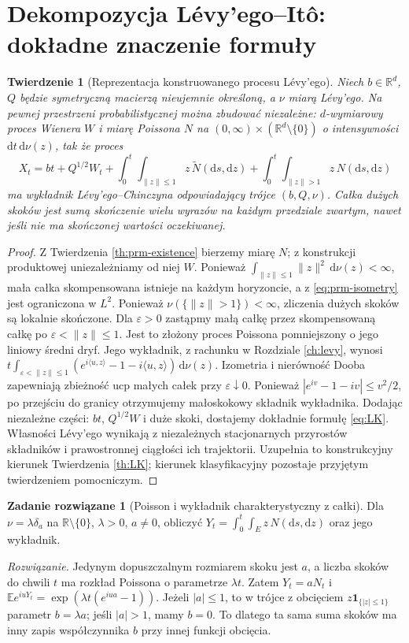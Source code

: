 \documentclass[11pt,a4paper,oneside]{report}
\numberwithin{equation}{chapter}
\theoremstyle{plain}
\newtheorem{twierdzenie}{Twierdzenie}[chapter]
\theoremstyle{definition}
\newtheorem{zadanie}{Zadanie rozwiązane}[chapter]
\theoremstyle{remark}
\newcommand{\R}{\mathbb{R}}
\newcommand{\E}{\mathbb{E}}
\newcommand{\ind}[1]{\mathbf{1}_{#1}}
\newcommand{\dd}{\mathrm{d}}
\begin{document}
\section{Dekompozycja Lévy'ego--Itô: dokładne znaczenie formuły}\label{sec:volIII:11:06}

\begin{twierdzenie}[Reprezentacja konstruowanego procesu Lévy'ego]\label{thm:volIII:11:07}
\label{th:levy-ito-made}
Niech $b\in\R^d$, $Q$ będzie symetryczną macierzą
nieujemnie określoną, a $\nu$ miarą Lévy'ego.
Na pewnej przestrzeni probabilistycznej można zbudować
niezależne: $d$-wymiarowy proces Wienera $W$ i miarę
Poissona $N$ na $(0,\infty)\times(\R^d\setminus\{0\})$
o intensywności $\dd t\,\dd\nu(z)$, tak że proces
\[
X_t=bt+Q^{1/2}W_t
+\int_0^t\int_{\|z\|\le1}z\,\widetilde N(\dd s,\dd z)
+\int_0^t\int_{\|z\|>1}z\,N(\dd s,\dd z)
\tag{11.4}\label{eq:levy-ito-made}
\]
ma wykładnik Lévy'ego--Chinczyna odpowiadający trójce
$(b,Q,\nu)$. Całka dużych skoków jest sumą skończenie
wielu wyrazów na każdym przedziale zwartym, nawet jeśli
nie ma skończonej wartości oczekiwanej.
\end{twierdzenie}
\begin{proof}
Z Twierdzenia \ref{th:prm-existence} bierzemy miarę $N$;
z konstrukcji produktowej uniezależniamy od niej $W$.
Ponieważ $\int_{\|z\|\le1}\|z\|^2\,\dd\nu(z)<\infty$,
mała całka skompensowana istnieje na każdym horyzoncie,
a z \eqref{eq:prm-isometry} jest ograniczona w $L^2$.
Ponieważ $\nu(\{\|z\|>1\})<\infty$, zliczenia dużych
skoków są lokalnie skończone. Dla $\varepsilon>0$
zastąpmy małą całkę przez skompensowaną całkę po
$\varepsilon<\|z\|\le1$. Jest to złożony proces
Poissona pomniejszony o jego liniowy średni dryf.
Jego wykładnik, z rachunku w Rozdziale \ref{ch:levy},
wynosi $t\int_{\varepsilon<\|z\|\le1}
(e^{i\langle u,z\rangle}-1-i\langle u,z\rangle)\,\dd\nu(z)$.
Izometria i nierówność Dooba zapewniają zbieżność ucp
małych całek przy $\varepsilon\downarrow0$.
Ponieważ $|e^{iv}-1-iv|\le v^2/2$, po przejściu
do granicy otrzymujemy małoskokowy składnik wykładnika.
Dodając niezależne części: $bt$, $Q^{1/2}W$ i duże skoki,
dostajemy dokładnie formułę \eqref{eq:LK}.
Własności Lévy'ego wynikają z niezależnych stacjonarnych
przyrostów składników i prawostronnej ciągłości ich
trajektorii. Uzupełnia to konstrukcyjny kierunek
Twierdzenia \ref{th:LK}; kierunek klasyfikacyjny pozostaje
przyjętym twierdzeniem pomocniczym.
\end{proof}

\begin{zadanie}[Poisson i wykładnik charakterystyczny z całki]
Dla $\nu=\lambda\delta_a$ na $\R\setminus\{0\}$,
$\lambda>0$, $a\ne0$, obliczyć
$Y_t=\int_0^t\int_E z\,N(\dd s,\dd z)$ oraz jego wykładnik.

\emph{Rozwiązanie.} Jedynym dopuszczalnym rozmiarem skoku
jest $a$, a liczba skoków do chwili $t$ ma rozkład
Poissona o parametrze $\lambda t$. Zatem $Y_t=aN_t$ i
$\E e^{iuY_t}=\exp(\lambda t(e^{iua}-1))$.
Jeżeli $|a|\le1$, to w trójce z obcięciem $z\ind{\{|z|\le1\}}$
parametr $b=\lambda a$; jeśli $|a|>1$, mamy $b=0$.
To dlatego ta sama suma skoków ma inny zapis współczynnika
$b$ przy innej funkcji obcięcia.
\end{zadanie}
\end{document}

